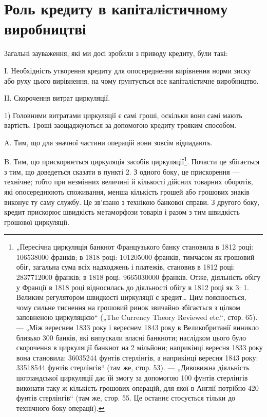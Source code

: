 
\section{Роль кредиту в капіталістичному виробництві}

Загальні зауваження, які ми досі зробили з приводу кредиту,
були такі:

I. Необхідність утворення кредиту для опосереднення вирівнення норми зиску або руху цього
вирівнення, на чому ґрунтується все капіталістичне виробництво.

II. Скорочення витрат циркуляції.

1) Головними витратами циркуляції є самі гроші, оскільки
вони самі мають вартість. Гроші заощаджуються за допомогою
кредиту трояким способом.

A. Тим, що для значної частини операцій вони зовсім відпадають.

B. Тим, що прискорюється циркуляція засобів циркуляції\footnote{
„Пересічна циркуляція банкнот Французького банку становила в 1812 році:
106538000 франків; в 1818 році: 101205000 франків, тимчасом як грошовий обіг,
загальна сума всіх надходжень і платежів, становив в 1812 році: 2837712000
франків; в 1818 році: 9665030000 франків. Отже, діяльність обігу у Франції
в 1818 році відносилась до діяльності обігу в 1812 році як 3: 1. Великим регулятором швидкості
циркуляції є кредит\dots{} Цим пояснюється, чому сильне тиснення на грошовий ринок звичайно збігається з
цілком заповненою циркуляцією“ („The Currency Theory Reviewed etc.“, стор. 65). — „Між вереснем 1833
року
і вереснем 1843 року в Великобританії виникло близько 300 банків, які випускали власні банкноти;
наслідком цього було скорочення в циркуляції банкнот
на 2 мільйони; наприкінці вересня 1833 року вона становила: 36035244 фунтів стерлінгів, а
наприкінці вересня 1843 року: 33518544 фунтів стерлінгів“
(там же, стор. 53). — „Дивовижна діяльність шотландської циркуляції дає їй
змогу за допомогою 100 фунтів стерлінгів виконати таку ж кількість грошових
операцій, для якої в Англії потрібно 420 фунтів стерлінгів“ (там же, стор. 55.
Це останнє стосується тільки до технічного боку операції).
}.
Почасти це збігається з тим, що доведеться сказати в пункті 2.
З одного боку, це прискорення — технічне; тобто при незмінних
величині й кількості дійсних товарних оборотів, які опосереднюють споживання, менша кількість грошей
або грошових знаків
виконує ту саму службу. Це зв’язано з технікою банкової справи.
З другого боку, кредит прискорює швидкість метаморфози товарів і разом з тим швидкість грошової
циркуляції.

